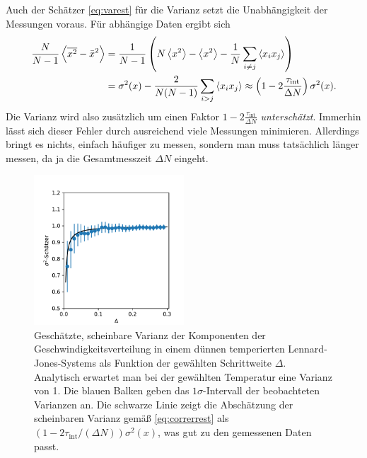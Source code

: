 Auch der Schätzer \eqref{eq:varest} für die Varianz setzt die
Unabhängigkeit der Messungen voraus. Für abhängige Daten ergibt sich
\begin{align}
  \frac{N}{N-1}\left\langle{\overline{x^2} - \bar{x}^2}\right\rangle
  &= \frac{1}{N-1}\left(N\left\langle{x^2}\right\rangle - \left\langle{x^2}\right\rangle
    - \frac{1}{N}\sum_{i\neq j} \left\langle{x_ix_j}\right\rangle\right)\nonumber\\
  &= \sigma^2(x) - \frac{2}{N(N-1)}\sum_{i> j} \left\langle{x_ix_j}\right\rangle
  \approx \left(1 - 2\frac{\tau_\text{int}}{\Delta N}\right)\sigma^2(x).
\end{align}
Die Varianz wird also zusätzlich um einen Faktor $1 -
2\frac{\tau_\text{int}}{\Delta N}$ \emph{unterschätzt}. Immerhin lässt sich
dieser Fehler durch ausreichend viele Messungen minimieren. Allerdings
bringt es nichts, einfach häufiger zu messen, sondern man muss
tatsächlich länger messen, da ja die Gesamtmesszeit $\Delta N$
eingeht.

\begin{figure}
  \centering
  \includegraphics[width=0.5\textwidth]{plots/error}
  \caption{Geschätzte, scheinbare Varianz der Komponenten der
    Geschwindigkeitsverteilung in einem dünnen temperierten
    Lennard-Jones-Systems als Funktion der gewählten Schrittweite
    $\Delta$. Analytisch erwartet man bei der gewählten Temperatur
    eine Varianz von 1. Die blauen Balken geben das
    $1\sigma$-Intervall der beobachteten Varianzen an. Die schwarze
    Linie zeigt die Abschätzung der scheinbaren Varianz gemäß
    \eqref{eq:correrrest} als $(1-2\tau_\text{int}/(\Delta N))\sigma^2(x)$, was
    gut zu den gemessenen Daten passt.}
  \label{fig:error}
\end{figure}

